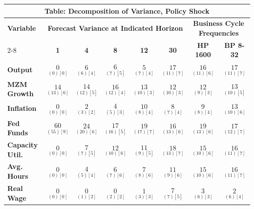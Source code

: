 \documentclass{article}
\begin{document}
 \begin{tabular}{|l|c|@{}c|c|@{}c|c|@{}c|c|} 
 \hline 
 \multicolumn{8}{|c|}{\textbf{Table: Decomposition of Variance, Policy Shock}} \\ \hline 
 \textbf{Variable} & \multicolumn{5}{|c}{\textbf{Forecast Variance at 
 Indicated Horizon}} & \multicolumn{2}{|c|}{\textbf{Business Cycle 
 Frequencies}} \\ \cline{2-8} 
 & \textbf{1} & \textbf{4} & \textbf{8} & \textbf{12} & \textbf{30} & \textbf{%
 HP 1600} & \textbf{BP 8-32} \\ \hline\hline 
 \textbf{Output} & $\underset{(  0) [  0]}{  0}$ & $\underset{(  6) [  4]}{  6}$ & $\underset{(  7) [  5]}{  6}$ & $\underset{(  7) [  4]}{  5}$ & $\underset{( 11) [  7]}{ 17}$ & $\underset{( 11) [  6]}{ 16}$ & $\underset{( 11) [  7]}{ 17}$ \\ \hline 
 \textbf{MZM Growth} & $\underset{( 13) [  6]}{ 14}$ & $\underset{( 12) [  5]}{ 14}$ & $\underset{( 12) [  4]}{ 16}$ & $\underset{( 10) [  3]}{ 13}$ & $\underset{( 10) [  3]}{ 12}$ & $\underset{(  9) [  3]}{ 12}$ & $\underset{( 10) [  5]}{ 13}$ \\ \hline 
 \textbf{Inflation} & $\underset{(  0) [  0]}{  0}$ & $\underset{(  3) [  2]}{  2}$ & $\underset{(  5) [  3]}{  4}$ & $\underset{(  8) [  4]}{ 10}$ & $\underset{(  7) [  4]}{  8}$ & $\underset{(  8) [  4]}{  9}$ & $\underset{( 10) [  6]}{ 13}$ \\ \hline 
 \textbf{Fed Funds} & $\underset{( 55) [  9]}{ 60}$ & $\underset{( 20) [  6]}{ 24}$ & $\underset{( 16) [  5]}{ 17}$ & $\underset{( 17) [  7]}{ 19}$ & $\underset{( 13) [  6]}{ 16}$ & $\underset{( 13) [  6]}{ 19}$ & $\underset{( 12) [  7]}{ 17}$ \\ \hline 
 \textbf{Capacity Util.} & $\underset{(  0) [  0]}{  0}$ & $\underset{(  7) [  5]}{  7}$ & $\underset{( 10) [  6]}{ 12}$ & $\underset{(  9) [  5]}{ 11}$ & $\underset{( 13) [  7]}{ 18}$ & $\underset{( 10) [  6]}{ 15}$ & $\underset{( 11) [  7]}{ 16}$ \\ \hline 
 \textbf{Avg. Hours} & $\underset{(  0) [  0]}{  0}$ & $\underset{(  5) [  4]}{  4}$ & $\underset{(  7) [  6]}{  6}$ & $\underset{(  8) [  6]}{  7}$ & $\underset{(  9) [  6]}{ 11}$ & $\underset{( 10) [  6]}{ 15}$ & $\underset{( 11) [  7]}{ 16}$ \\ \hline 
 \textbf{Real Wage} &  $\underset{(  0) [  0]}{  0}$ & $\underset{(  1) [  2]}{  0}$ & $\underset{(  2) [  2]}{  0}$ & $\underset{(  3) [  3]}{  1}$ & $\underset{(  7) [  5]}{  7}$ & $\underset{(  6) [  3]}{  3}$ & $\underset{(  6) [  4]}{  2}$ \\ \hline 

\end{tabular}
\end{document}
